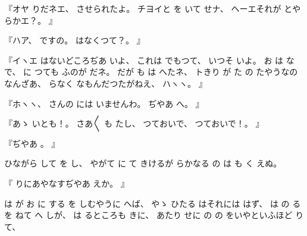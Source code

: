 『オヤ
りだネエ、
%
させられたよ。
%
チヨイと
を
いて
せナ、
%
ヘーエそれが
とやらかエ？。
』

『ハア、
%
ですの。
%
はなくつて？。
』

『イヽエ
はないどころぢあ
いよ、
%
これは
でもつて、
%
いつそ
いよ。
%
お
は
な
で、
%
に
つても
ふのが
だネ。
%
だが
も
は
へたネ、
%
トきり
が
た
の
たやうなのなんざあ、
%
らなく
なもんだつたがねえ、
%
ハヽヽ。
』

『ホヽヽ、
%
さんの
には
いませんわ。
%
ぢやあ
へ。
』

『あゝ
いとも！。
%
さあ〳〵
も
たし、
%
つておいで、
%
つておいで！。
』

『ぢやあ
。
』

ひながら
して
を
し、
%
やがて
に
て
きけるが
らかなる
の
は
も
く
えぬ。

『
りにあやなすぢやあ
えか。
』

は
が
お
に
する
を
しむやうに
へば、
%
やゝ
ひたる
はそれには
はず、
%
は
の
る
を
ねて
へ
しが、
%
は
るところも%
きに、
%
あたり
せに
の
の
をいやといふほど
りて、

